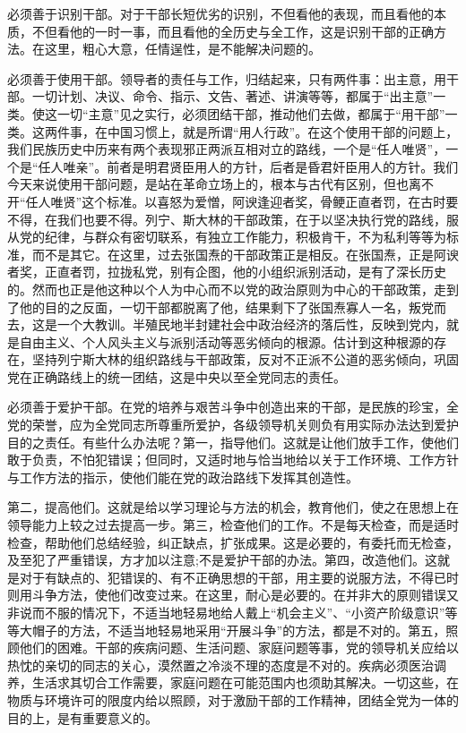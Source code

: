 必须善于识别干部。对于干部长短优劣的识别，不但看他的表现，而且看他的本质，不但看他的一时一事，而且看他的全历史与全工作，这是识别干部的正确方法。在这里，粗心大意，任情逞性，是不能解决问题的。

必须善于使用干部。领导者的责任与工作，归结起来，只有两件事：出主意，用干部。一切计划、决议、命令、指示、文告、著述、讲演等等，都属于“出主意”一类。使这一切“主意”见之实行，必须团结干部，推动他们去做，都属于“用干部”一类。这两件事，在中国习惯上，就是所谓“用人行政”。在这个使用干部的问题上，我们民族历史中历来有两个表现邪正两派互相对立的路线，一个是“任人唯贤”，一个是“任人唯亲”。前者是明君贤臣用人的方针，后者是昏君奸臣用人的方针。我们今天来说使用干部问题，是站在革命立场上的，根本与古代有区别，但也离不开“任人唯贤”这个标准。以喜怒为爱憎，阿谀逢迎者奖，骨鲠正直者罚，在古时要不得，在我们也要不得。列宁、斯大林的干部政策，在于以坚决执行党的路线，服从党的纪律，与群众有密切联系，有独立工作能力，积极肯干，不为私利等等为标准，而不是其它。在这里，过去张国焘的干部政策正是相反。在张国焘，正是阿谀者奖，正直者罚，拉拢私党，别有企图，他的小组织派别活动，是有了深长历史的。然而也正是他这种以个人为中心而不以党的政治原则为中心的干部政策，走到了他的目的之反面，一切干部都脱离了他，结果剩下了张国焘寡人一名，叛党而去，这是一个大教训。半殖民地半封建社会中政治经济的落后性，反映到党内，就是自由主义、个人风头主义与派别活动等恶劣倾向的根源。估计到这种根源的存在，坚持列宁斯大林的组织路线与干部政策，反对不正派不公道的恶劣倾向，巩固党在正确路线上的统一团结，这是中央以至全党同志的责任。

必须善于爱护干部。在党的培养与艰苦斗争中创造出来的干部，是民族的珍宝，全党的荣誉，应为全党同志所尊重所爱护，各级领导机关则负有用实际办法达到爱护目的之责任。有些什么办法呢？第一，指导他们。这就是让他们放手工作，使他们敢于负责，不怕犯错误；但同时，又适时地与恰当地给以关于工作环境、工作方针与工作方法的指示，使他们能在党的政治路线下发挥其创造性。

第二，提高他们。这就是给以学习理论与方法的机会，教育他们，使之在思想上在领导能力上较之过去提高一步。第三，检查他们的工作。不是每天检查，而是适时检查，帮助他们总结经验，纠正缺点，扩张成果。这是必要的，有委托而无检查，及至犯了严重错误，方才加以注意;不是爱护干部的办法。第四，改造他们。这就是对于有缺点的、犯错误的、有不正确思想的干部，用主要的说服方法，不得已时则用斗争方法，使他们改变过来。在这里，耐心是必要的。在并非大的原则错误又非说而不服的情况下，不适当地轻易地给人戴上“机会主义”、“小资产阶级意识”等等大帽子的方法，不适当地轻易地采用“开展斗争”的方法，都是不对的。第五，照顾他们的困难。干部的疾病问题、生活问题、家庭问题等事，党的领导机关应给以热忱的亲切的同志的关心，漠然置之冷淡不理的态度是不对的。疾病必须医治调养，生活求其切合工作需要，家庭问题在可能范围内也须助其解决。一切这些，在物质与环境许可的限度内给以照顾，对于激励干部的工作精神，团结全党为一体的目的上，是有重要意义的。

